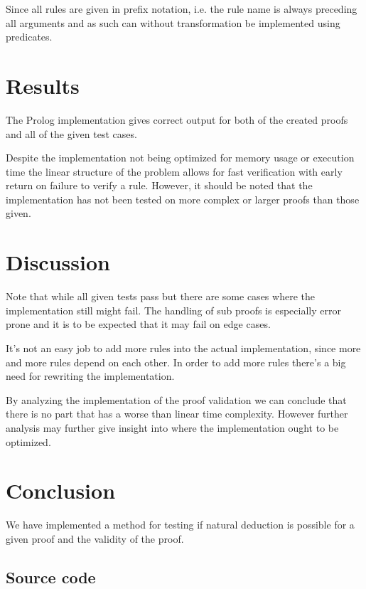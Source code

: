 \documentclass[a4paper,11pt]{article}
\begin{document}
Since all rules are given in prefix notation, i.e. the rule name is always preceding all arguments and as such can without transformation be implemented using predicates.
\section{Results}
The Prolog implementation gives correct output for both of the created proofs and all of the given test cases.

Despite the implementation not being optimized for memory usage or execution time the linear structure of the problem allows for fast verification with early return on failure to verify a rule. However, it should be noted that the implementation has not been tested on more complex or larger proofs than those given.

\section{Discussion}
Note that while all given tests pass but there are some cases where the implementation still might fail.
The handling of sub proofs is especially error prone and it is to be expected that it may fail on edge cases.

It's not an easy job to add more rules into the actual implementation, since more and more rules depend on each other.
In order to add more rules there's a big need for rewriting the implementation.

By analyzing the implementation of the proof validation we can conclude that there is no part that has a worse than linear time complexity. However further analysis may further give insight into where the implementation ought to be optimized.
\section{Conclusion}
We have implemented a method for testing if natural deduction is possible for a given proof and the validity of the proof.
\newpage
\begin{appendices}
\section{Source code}

\end{appendices}
\end{document}
